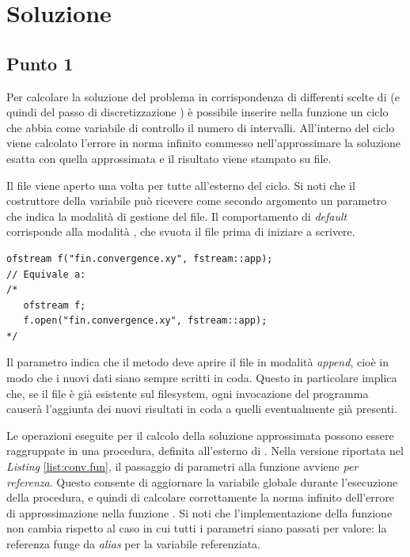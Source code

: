 \newpage
\section*{Soluzione}

\subsection*{Punto 1}

Per calcolare la soluzione del problema in
corrispondenza di differenti scelte di  (e quindi del passo di
discretizzazione ) \`e possibile
 inserire nella funzione  un ciclo  che abbia
 come variabile di controllo il numero di intervalli. All'interno del ciclo viene
 calcolato l'errore in norma infinito commesso nell'approssimare la
 soluzione esatta con quella approssimata  e il risultato
 viene stampato su file.

\lstset{basicstyle=\scriptsize\sf}

\lstset{basicstyle=\sf}

Il file viene aperto una volta per tutte all'esterno del ciclo. Si
noti che il costruttore della variabile  pu\`o
ricevere come secondo argomento un parametro che indica la modalit\`a
di gestione del file. Il comportamento di \emph{default} corrisponde alla modalit\`a
, che svuota il file prima di iniziare a scrivere.

\lstset{basicstyle=\scriptsize\sf}
\begin{lstlisting}
ofstream f("fin.convergence.xy", fstream::app);
// Equivale a:
/*
   ofstream f;
   f.open("fin.convergence.xy", fstream::app);
*/
\end{lstlisting}
\lstset{basicstyle=\sf}

Il parametro  indica che il metodo 
deve aprire il file in modalit\`a \emph{append}, cio\`e in modo che i
nuovi dati siano sempre scritti in coda. Questo in particolare implica
che, se il file \`e gi\`a esistente sul filesystem, ogni invocazione
del programma causer\`a l'aggiunta dei nuovi risultati in coda a
quelli eventualmente gi\`a presenti.

Le operazioni eseguite per il calcolo della soluzione approssimata
 possono essere raggruppate in una procedura, definita
all'esterno di . Nella versione riportata nel \emph{Listing}
\ref{list:conv.fun}, il passaggio di parametri alla
funzione avviene \emph{per referenza}. Questo consente di aggiornare
la variabile globale  durante l'esecuzione della procedura,
e quindi di calcolare correttamente la norma infinito dell'errore di
approssimazione nella funzione . Si noti che
l'implementazione della funzione  non cambia rispetto
al caso in cui tutti i parametri siano passati per valore: la
referenza funge da \emph{alias} per la variabile referenziata.

